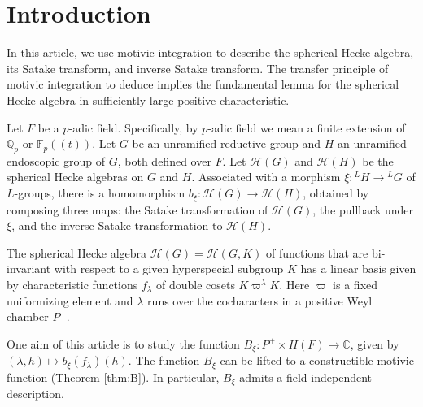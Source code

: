 
% 
% 


\newcommand{\XX}[1]{{\it  [To do: #1]}}
\newcommand{\ring}[1]{\mathbb{#1}}
\newcommand{\g}[1]{\langle{#1}\rangle}
\def\op#1{{\operatorname{#1}}}
\def\inv{\op{inv}}
\def\dom{P^+}
\def\Q{{\ring{Q}}}
\def\card{\op{card}}

\def\C{\mathcal C}
\def\N{\mathcal N}
\def\H{\mathcal H}
\def\M{\mathcal M}
\def\T{\mathcal T}

\def\n{{\mathfrak n}}


\def\libel#1{{\text{\sc [#1]~}}\label{#1}}
\def\rif#1{(\ref{#1}-{\text{\sc #1})}}



\section{Introduction}\libel{XX} %

In this article, we use motivic integration to describe the spherical
Hecke algebra, its Satake transform, and inverse Satake transform.
The transfer principle of motivic integration to deduce implies the fundamental
lemma for the spherical Hecke algebra in sufficiently large positive characteristic.

Let $F$ be a $p$-adic field.  Specifically, 
by $p$-adic field we mean a finite extension of $\ring{Q}_p$ or $\ring{F}_p((t))$.
Let $G$ be an unramified reductive group and $H$ an unramified endoscopic group of $G$, both defined over $F$.
Let $\H(G)$ and $\H(H)$ be the spherical Hecke algebras on $G$ and $H$.
Associated with  a morphism $\xi:{}^LH\to {}^LG$ of $L$-groups, there is a homomorphism
$b_\xi:\H(G)\to \H(H)$, obtained by composing three maps: the Satake transformation of $\H(G)$,
the pullback under $\xi$, and the inverse Satake transformation to $\H(H)$.

The spherical Hecke algebra $\H(G)=\H(G,K)$ of functions that are bi-invariant with respect
to a given hyperspecial subgroup $K$ has a linear basis given by characteristic functions $f_\lambda$
of double cosets $K\varpi^\lambda K$.  Here $\varpi$ is a fixed uniformizing element and $\lambda$
runs over the cocharacters in a positive Weyl chamber $P^+$.

One aim of this article is to study the function $B_\xi:P^+\times H(F)\to \ring{C}$, given by
$(\lambda,h)\mapsto b_\xi(f_\lambda)(h)$.   The function $B_\xi$ can be lifted to a constructible motivic
function (Theorem \ref{thm:B}).   In particular, $B_\xi$ admits a field-independent description.  

